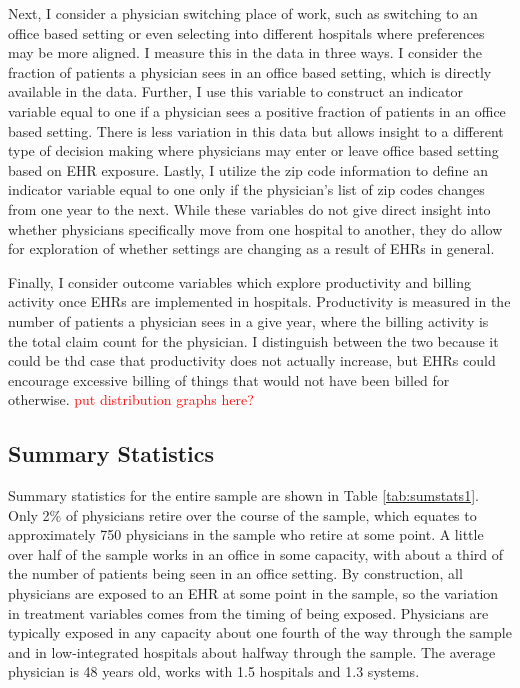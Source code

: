 \documentclass[11pt]{article}
\begin{document}
Next, I consider a physician switching place of work, such as switching to an office based setting or even selecting into different hospitals where preferences may be more aligned. I measure this in the data in three ways. I consider the fraction of patients a physician sees in an office based setting, which is directly available in the data. Further, I use this variable to construct an indicator variable equal to one if a physician sees a positive fraction of patients in an office based setting. There is less variation in this data but allows insight to a different type of decision making where physicians may enter or leave office based setting based on EHR exposure. Lastly, I utilize the zip code information to define an indicator variable equal to one only if the physician's list of zip codes changes from one year to the next. While these variables do not give direct insight into whether physicians specifically move from one hospital to another, they do allow for exploration of whether settings are changing as a result of EHRs in general.

Finally, I consider outcome variables which explore productivity and billing activity once EHRs are implemented in hospitals. Productivity is measured in the number of patients a physician sees in a give year, where the billing activity is the total claim count for the physician. I distinguish between the two because it could be thd case that productivity does not actually increase, but EHRs could encourage excessive billing of things that would not have been billed for otherwise. \textcolor{red}{put distribution graphs here?}

\subsection{Summary Statistics}

Summary statistics for the entire sample are shown in Table \ref{tab:sumstats1}. Only 2\% of physicians retire over the course of the sample, which equates to approximately 750 physicians in the sample who retire at some point. A little over half of the sample works in an office in some capacity, with about a third of the number of patients being seen in an office setting. By construction, all physicians are exposed to an EHR at some point in the sample, so the variation in treatment variables comes from the timing of being exposed. Physicians are typically exposed in any capacity about one fourth of the way through the sample and in low-integrated hospitals about halfway through the sample. The average physician is 48 years old, works with 1.5 hospitals and 1.3 systems. 
\end{document}
